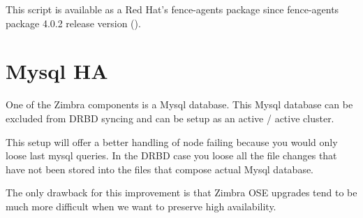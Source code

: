 This script is available as a Red Hat's fence-agents package since fence-agents package 4.0.2 release version (\cite{LinuxClusterML201307}).

\section {Mysql HA}
One of the Zimbra components is a Mysql database. This Mysql database can be excluded from DRBD syncing and can be setup as an active / active cluster.

This setup will offer a better handling of node failing because you would only loose last mysql queries. In the DRBD case you loose all the file changes that have not been stored into the files that compose actual Mysql database.

The only drawback for this improvement is that Zimbra OSE upgrades tend to be much more difficult when we want to preserve high availability.



